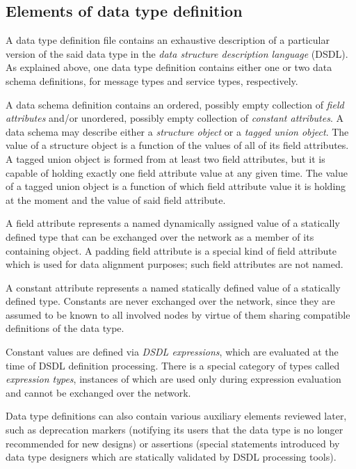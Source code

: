 \subsection{Elements of data type definition}

A data type definition file contains an exhaustive description of a particular version of the said data type in the
\emph{data structure description language} (DSDL).
As explained above, one data type definition contains either one or two data schema definitions,
for message types and service types, respectively.

A data schema definition contains an ordered, possibly empty collection of \emph{field attributes} and/or
unordered, possibly empty collection of \emph{constant attributes}.
A data schema may describe either a \emph{structure object} or a \emph{tagged union object}.
The value of a structure object is a function of the values of all of its field attributes.
A tagged union object is formed from at least two field attributes,
but it is capable of holding exactly one field attribute value at any given time.
The value of a tagged union object is a function of which field attribute value
it is holding at the moment and the value of said field attribute.

A field attribute represents a named dynamically assigned value of a statically defined type
that can be exchanged over the network as a member of its containing object.
A padding field attribute is a special kind of field attribute which is used for data alignment purposes;
such field attributes are not named.

A constant attribute represents a named statically defined value of a statically defined type.
Constants are never exchanged over the network, since they are assumed to be known to all involved nodes
by virtue of them sharing compatible definitions of the data type.

Constant values are defined via \emph{DSDL expressions},
which are evaluated at the time of DSDL definition processing.
There is a special category of types called \emph{expression types},
instances of which are used only during expression evaluation
and cannot be exchanged over the network.

Data type definitions can also contain various auxiliary elements reviewed later,
such as deprecation markers (notifying its users that the data type is no longer recommended for new designs)
or assertions (special statements introduced by data type designers
which are statically validated by DSDL processing tools).


